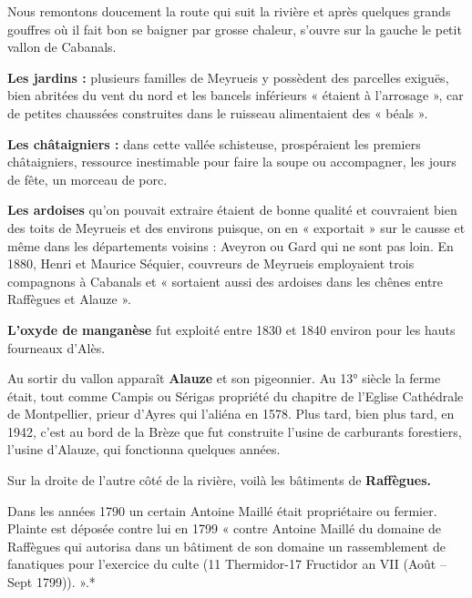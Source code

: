 

Nous remontons doucement la route qui suit la rivière et après quelques grands gouffres où il
fait bon se baigner par grosse chaleur, s’ouvre sur la gauche le petit vallon de Cabanals.

\textbf{Les jardins :} plusieurs familles de Meyrueis y possèdent des parcelles exiguës, bien abritées
du vent du nord et les bancels inférieurs « étaient à l’arrosage », car de petites chaussées
construites dans le ruisseau alimentaient des « béals ».

\textbf{Les châtaigniers :} dans cette vallée schisteuse, prospéraient les premiers châtaigniers,
ressource inestimable pour faire la soupe ou accompagner, les jours de fête, un morceau de
porc.

\textbf{Les ardoises} qu’on pouvait extraire étaient de bonne qualité et couvraient bien des toits de
Meyrueis et des environs puisque, on en « exportait » sur le causse et même dans les
départements voisins : Aveyron ou Gard qui ne sont pas loin. En 1880, Henri et Maurice
Séquier, couvreurs de Meyrueis employaient trois compagnons à Cabanals et « sortaient aussi
des ardoises dans les chênes entre Raffègues et Alauze ».

\textbf{L’oxyde de manganèse} fut exploité entre 1830 et 1840 environ pour les hauts fourneaux
d’Alès.

\vspace{0.2cm}

Au sortir du vallon apparaît \textbf{Alauze} et son pigeonnier. Au 13° siècle la ferme était, tout
comme Campis ou Sérigas propriété du chapitre de l’Eglise Cathédrale de Montpellier, prieur
d’Ayres qui l’aliéna en 1578. Plus tard, bien plus tard, en 1942, c’est au bord de la Brèze que
fut construite l’usine de carburants forestiers, l’usine d’Alauze, qui fonctionna quelques
années.

\vspace{0.2cm}

Sur la droite de l’autre côté de la rivière, voilà les bâtiments de \textbf{Raffègues.}

Dans les années 1790 un certain Antoine Maillé était propriétaire ou fermier. Plainte est
déposée contre lui en 1799 « contre Antoine Maillé du domaine de Raffègues qui autorisa
dans un bâtiment de son domaine un rassemblement de fanatiques pour l’exercice du culte
(11 Thermidor-17 Fructidor an VII (Août --Sept 1799)). ».*

